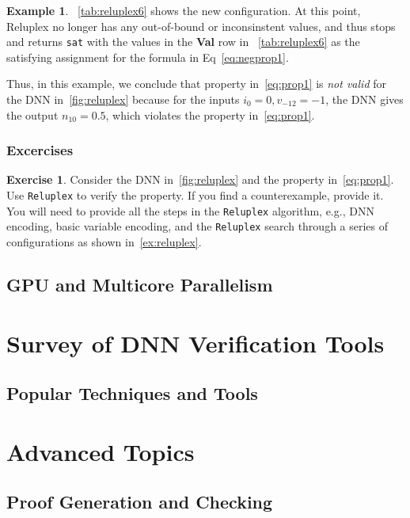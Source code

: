 \documentclass[oneside,11pt,dvipsnames]{book}
\numberwithin{equation}{section}
\theoremstyle{definition}
\newtheorem{example}{Example}[section]
\newtheorem{exercise}{Exercise}[section]
\theoremstyle{remark}
\newcommand{\reluplex}{\texttt{Reluplex}}
\newcommand{\sat}{\texttt{sat}}
\begin{document}
\begin{example}
~\autoref{tab:reluplex6} shows the new configuration.
At this point, Reluplex no longer has any out-of-bound or inconsinstent values, and thus stops and returns \sat{} with the values in the \textbf{Val} row in ~\autoref{tab:reluplex6} as the satisfying assignment for the formula in Eq~\ref{eq:negprop1}.

Thus, in this example, we conclude that property in~\autoref{eq:prop1} is \emph{not valid} for the DNN in~\autoref{fig:reluplex} because for the inputs $i_0=0,v_{-12}=-1$, the DNN gives the output $n_{10}=0.5$, which violates the property in~\autoref{eq:prop1}.
\end{example}

\section{Excercises}
\begin{exercise}
Consider the DNN in~\autoref{fig:reluplex} and the property in~\autoref{eq:prop1}.  Use \reluplex{} to verify the property.  If you find a counterexample, provide it.  You will need to provide all the steps in the \reluplex{} algorithm, e.g., DNN encoding, basic variable encoding, and the \reluplex{} search through a series of configurations as shown in~\autoref{ex:reluplex}.

\end{exercise}


\chapter{GPU and Multicore Parallelism}


\part{Survey of DNN Verification Tools}

\chapter{Popular Techniques and Tools}




\part{Advanced Topics\label{part:advanced-topics}}




\chapter{Proof Generation and Checking}\label{chapter:proof-gen-check}
\end{document}
